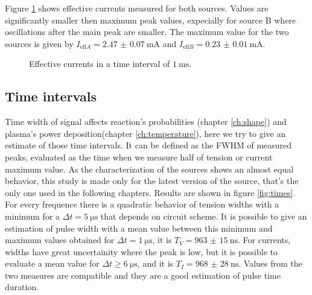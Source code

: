 Figure \ref{fig:ieff} shows effective currents measured for both sources. Values are significantly smaller then maximum peak values, expecially for source B where oscillations after the main peak are smaller. The maximum value for the two sources is given by $I_{\text{eff} A} = \SI{2.47(7)}{\milli\ampere}$ and $I_{\text{eff} B} = \SI{0.23(1)}{\milli\ampere}$.

\begin{figure}
 \centering
 \caption{Effective currents in a time interval of $\SI{1}{\milli\second}$.}
 \label{fig:ieff}
\end{figure}


\subsection{Time intervals}
Time width of signal affects reaction's probabilities (chapter \ref{ch:shape}) and plasma's power deposition(chapter \ref{ch:temperature}), here we try to give an estimate of those time intervals. It can be defined as the FWHM of measured peaks, evaluated as the time when we measure half of tension or current maximum value. As the characterization of the sources shows an almost equal behavior, this study is made only for the latest version of the source, that's the only one used in the following chapters. Results are shown in figure \ref{fig:times}.
For every frequence there is a quadratic behavior of tension widths with a minimum for a $\Delta t = \SI{5}{\micro\second}$ that depends on circuit scheme. It is possible to give an estimation of pulse width with a mean value between this minimum and maximum values obtained for $\Delta t = \SI{1}{\micro\second}$, it is $T_{V} = \SI{963(15)}{\nano\second}$. For currents, widths have great uncertainity where the peak is low, but it is possible to evaluate a mean value for $\Delta t \ge \SI{6}{\micro\second}$, and it is $T_{I} = \SI{968(28)}{\nano\second}$.
Values from the two measures are compatible and they are a good estimation of pulse time duration.

